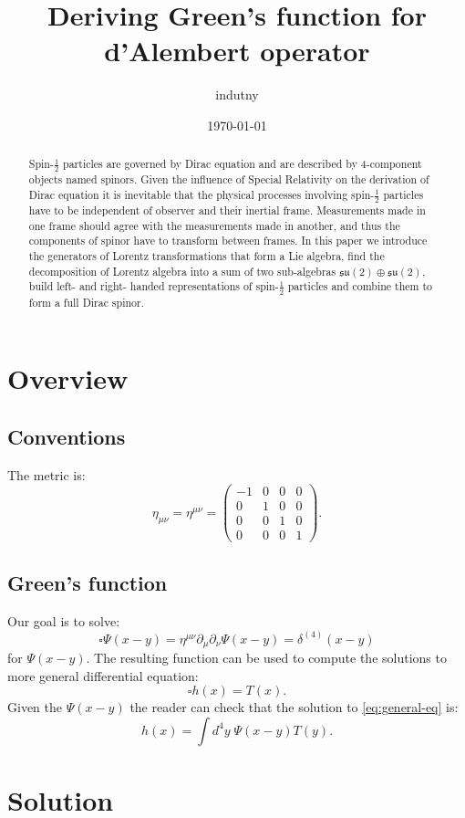 \documentclass[aps,prd,final,twocolumn,floats,floatfix,nofootinbib,10pt]{revtex4-1}
\begin{document}
\title{Deriving Green's function for d'Alembert operator}
\author{indutny}
\date{\today}
\noaffiliation

\begin{abstract}
Spin-$\frac{1}{2}$ particles are governed by Dirac equation and are described by
4-component objects named spinors. Given the influence of Special Relativity
on the derivation of Dirac equation it is inevitable that the physical processes
involving spin-$\frac{1}{2}$ particles have to be independent of observer and their
inertial frame. Measurements made in one frame should agree with the
measurements made in another, and thus the components of spinor have to
transform between frames. In this paper we introduce the generators of
Lorentz transformations that form a Lie algebra, find the decomposition of
Lorentz algebra into a sum of two sub-algebras $\mathfrak{su}(2) \oplus \mathfrak{su}(2)$,
build left- and right- handed representations of spin-$\frac{1}{2}$ particles and combine
them to form a full Dirac spinor.
\end{abstract}

\maketitle

\section{Overview}

\subsection{Conventions}

The metric is:
\begin{equation}
\eta_{\mu\nu} = \eta^{\mu\nu} = \begin{pmatrix}
-1 & 0 & 0 & 0 \\
0 & 1 & 0 & 0 \\
0 & 0 & 1 & 0 \\
0 & 0 & 0 & 1
\end{pmatrix}.
\end{equation}

\subsection{Green's function}

Our goal is to solve:
\begin{equation}
\square \Psi(x - y) = \eta^{\mu\nu} \partial_\mu \partial_\nu \Psi(x - y) = \delta^{(4)} (x - y)
\end{equation}
for $\Psi(x - y)$.
The resulting function can be used to compute the solutions to more general differential equation:
\begin{equation}\label{eq:general-eq}
\square h(x) = T(x).
\end{equation}
Given the $\Psi(x - y)$ the reader can check that the solution to \eqref{eq:general-eq} is:
\begin{equation}
h(x) = \int d^4y \; \Psi(x - y) T(y).
\end{equation}

\section{Solution}
\end{document}
